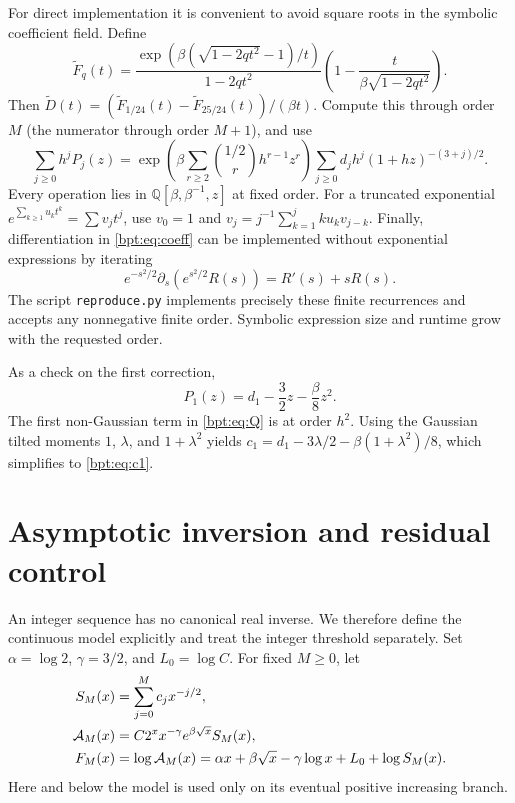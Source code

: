 \documentclass[11pt]{article}
\theoremstyle{remark}\newtheorem{remark}[theorem]{Remark}
\begin{document}
For direct implementation it is convenient to avoid square roots in the symbolic coefficient field. Define
\begin{equation}\label{bpt:eq:Fbeta}
 \widetilde F_q(t)=\frac{\exp\!\left(\beta(\sqrt{1-2qt^2}-1)/t\right)}{1-2qt^2}
       \left(1-\frac t{\beta\sqrt{1-2qt^2}}\right).
\end{equation}
Then $\widetilde D(t)=(\widetilde F_{1/24}(t)-\widetilde F_{25/24}(t))/(\beta t)$.
Compute this through order $M$ (the numerator through order $M+1$), and use
\begin{equation}\label{bpt:eq:Pconstruct}
 \sum_{j\ge0}h^jP_j(z)
 =\exp\!\left(\beta\sum_{r\ge2}\binom{1/2}{r}h^{r-1}z^r\right)
       \sum_{j\ge0}d_jh^j(1+hz)^{-(3+j)/2}.
\end{equation}
Every operation lies in $\mathbb Q[\beta,\beta^{-1},z]$ at fixed order.
For a truncated exponential $e^{\sum_{k\ge1}u_kt^k}=\sum v_jt^j$, use
$v_0=1$ and $v_j=j^{-1}\sum_{k=1}^jku_kv_{j-k}$.
Finally, differentiation in \eqref{bpt:eq:coeff} can be implemented without exponential expressions by iterating
\[
 e^{-s^2/2}\partial_s(e^{s^2/2}R(s))=R'(s)+sR(s).
\]
The script \texttt{reproduce.py} implements precisely these finite recurrences and accepts any nonnegative finite order. Symbolic expression size and runtime grow with the requested order.

As a check on the first correction,
\[
 P_1(z)=d_1-\frac32z-\frac\beta8z^2.
\]
The first non-Gaussian term in \eqref{bpt:eq:Q} is at order $h^2$.
Using the Gaussian tilted moments $1$, $\lambda$, and $1+\lambda^2$ yields
$c_1=d_1-3\lambda/2-\beta(1+\lambda^2)/8$, which simplifies to \eqref{bpt:eq:c1}.

\section{Asymptotic inversion and residual control}\label{bpt:sec:inverse}
An integer sequence has no canonical real inverse. We therefore define the continuous model explicitly and treat the integer threshold separately.
Set $\alpha=\log2$, $\gamma=3/2$, and $L_0=\log C$. For fixed $M\ge0$, let
\begin{align}
 S_M(x)&=\sum_{j=0}^M c_jx^{-j/2},\notag\\
 \mathcal A_M(x)&=C2^xx^{-\gamma}e^{\beta\sqrt x}S_M(x),\label{bpt:eq:model}\\
 F_M(x)&=\log\mathcal A_M(x)
       =\alpha x+\beta\sqrt x-\gamma\log x+L_0+\log S_M(x).
 \label{bpt:eq:FM}
\end{align}
Here and below the model is used only on its eventual positive increasing branch.
\end{document}
